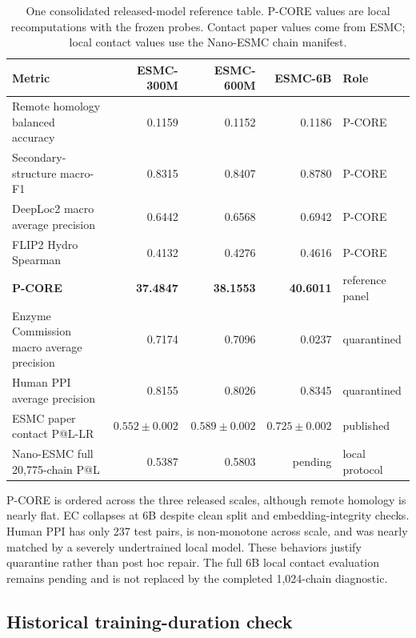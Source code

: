 \documentclass{article}
\begin{document}
\begin{table}[H]
  \centering
  \scriptsize
  \setlength{\tabcolsep}{4pt}
  \begin{tabularx}{\textwidth}{@{}Yrrrl@{}}
    \toprule
    Metric & ESMC-300M & ESMC-600M & ESMC-6B & Role \\
    \midrule
    Remote homology balanced accuracy & 0.1159 & 0.1152 & 0.1186 & P-CORE \\
    Secondary-structure macro-F1 & 0.8315 & 0.8407 & 0.8780 & P-CORE \\
    DeepLoc2 macro average precision & 0.6442 & 0.6568 & 0.6942 & P-CORE \\
    FLIP2 Hydro Spearman & 0.4132 & 0.4276 & 0.4616 & P-CORE \\
    \textbf{P-CORE} & \textbf{37.4847} & \textbf{38.1553} & \textbf{40.6011} & reference panel \\
    \midrule
    Enzyme Commission macro average precision & 0.7174 & 0.7096 & 0.0237 & quarantined \\
    Human PPI average precision & 0.8155 & 0.8026 & 0.8345 & quarantined \\
    \midrule
    ESMC paper contact P@L-LR & $0.552\pm0.002$ & $0.589\pm0.002$ & $0.725\pm0.002$ & published \\
    Nano-ESMC full 20,775-chain P@L & 0.5387 & 0.5803 & pending & local protocol \\
    \bottomrule
  \end{tabularx}
  \caption{One consolidated released-model reference table. P-CORE values are
  local recomputations with the frozen probes. Contact paper values come from
  ESMC; local contact values use the Nano-ESMC chain manifest.}
  \label{tab:released-baselines}
\end{table}

P-CORE is ordered across the three released scales, although remote homology
is nearly flat. EC collapses at 6B despite clean split and embedding-integrity
checks. Human PPI has only 237 test pairs, is non-monotone across scale, and
was nearly matched by a severely undertrained local model. These behaviors
justify quarantine rather than post hoc repair. The full 6B local contact
evaluation remains pending and is not replaced by the completed 1,024-chain
diagnostic.

\subsection{Historical training-duration check}
\end{document}
